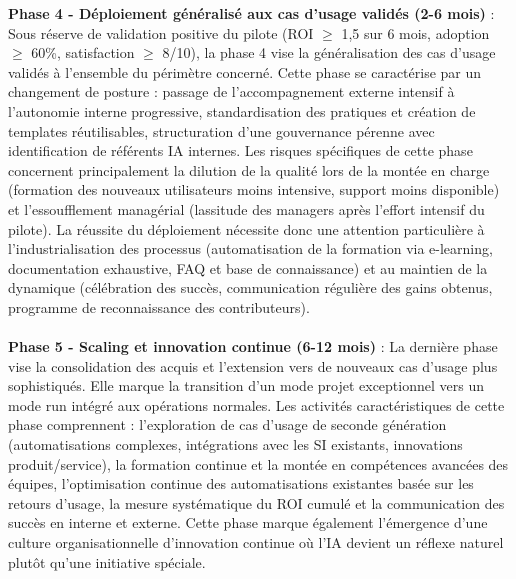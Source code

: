 \textbf{Phase 4 - Déploiement généralisé aux cas d'usage validés (2-6 mois)} : Sous réserve de validation positive du pilote (ROI $\geq$ 1,5 sur 6 mois, adoption $\geq$ 60\%, satisfaction $\geq$ 8/10), la phase 4 vise la généralisation des cas d'usage validés à l'ensemble du périmètre concerné. Cette phase se caractérise par un changement de posture : passage de l'accompagnement externe intensif à l'autonomie interne progressive, standardisation des pratiques et création de templates réutilisables, structuration d'une gouvernance pérenne avec identification de référents IA internes. Les risques spécifiques de cette phase concernent principalement la dilution de la qualité lors de la montée en charge (formation des nouveaux utilisateurs moins intensive, support moins disponible) et l'essoufflement managérial (lassitude des managers après l'effort intensif du pilote). La réussite du déploiement nécessite donc une attention particulière à l'industrialisation des processus (automatisation de la formation via e-learning, documentation exhaustive, FAQ et base de connaissance) et au maintien de la dynamique (célébration des succès, communication régulière des gains obtenus, programme de reconnaissance des contributeurs).
\\\\
\textbf{Phase 5 - Scaling et innovation continue (6-12 mois)} : La dernière phase vise la consolidation des acquis et l'extension vers de nouveaux cas d'usage plus sophistiqués. Elle marque la transition d'un mode projet exceptionnel vers un mode run intégré aux opérations normales. Les activités caractéristiques de cette phase comprennent : l'exploration de cas d'usage de seconde génération (automatisations complexes, intégrations avec les SI existants, innovations produit/service), la formation continue et la montée en compétences avancées des équipes, l'optimisation continue des automatisations existantes basée sur les retours d'usage, la mesure systématique du ROI cumulé et la communication des succès en interne et externe. Cette phase marque également l'émergence d'une culture organisationnelle d'innovation continue où l'IA devient un réflexe naturel plutôt qu'une initiative spéciale.

